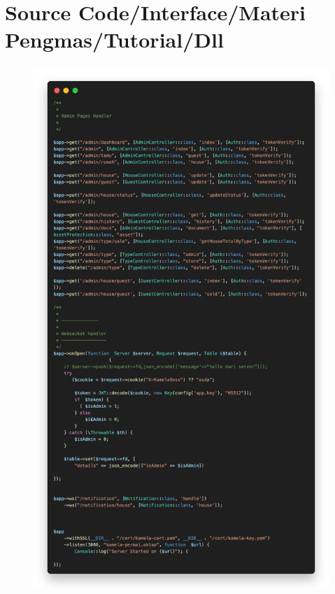 %


%


\renewcommand{\thepage}{C - \arabic{page}}
\chapter{Source Code/Interface/Materi Pengmas/Tutorial/Dll}
\begin{figure}
        \centering
        \includegraphics[width=0.75\linewidth]{lampiran d.png}
    \end{figure}
